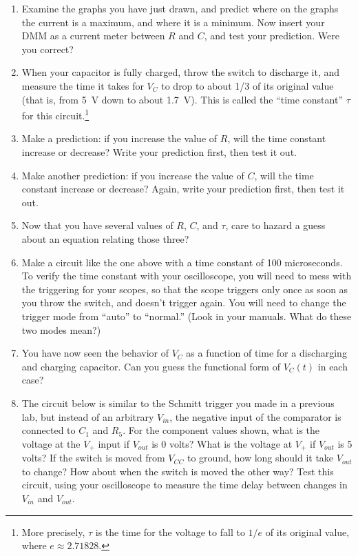 \begin{enumerate}[wide]
\item Examine the graphs you have just drawn, and predict where on the graphs the current is a maximum, and where it is a minimum.  Now insert your DMM as a current meter between $R$ and $C$, and test your prediction.  Were you correct?

\item When your capacitor is fully charged, throw the switch to discharge it, and measure the time it takes for $V_C$ to drop to about 1/3 of its original value (that is, from 5~V down to about 1.7~V).  This is called the ``time constant'' $\tau$ for this circuit.\footnote{More precisely, $\tau$ is the time for the voltage to fall to $1/e$ of its original value, where $e \approx 2.71828$.}

\item Make a prediction: if you increase the value of $R$, will the time constant increase or decrease?  Write your prediction first, then test it out.

\item Make another prediction: if you increase the value of $C$, will the time constant increase or decrease?  Again, write your prediction first, then test it out.

\item Now that you have several values of $R$, $C$, and $\tau$, care to hazard a guess about an equation relating those three?

\item Make a circuit like the one above with a time constant of 100 microseconds.   To verify the time constant with your oscilloscope, you will need to mess with the triggering for your scopes, so that the scope triggers only once as soon as you throw the switch, and doesn't trigger again.  You will need to change the trigger mode from ``auto'' to ``normal.''  (Look in your manuals.  What do these two modes mean?)

\item You have now seen the behavior of $V_C$ as a function of time for a discharging and charging capacitor.  Can you guess the functional form of $V_C(t)$ in each case?

\item The circuit below is similar to the Schmitt trigger you made in a previous lab, but instead of an arbitrary $V_{in}$, the negative input of the comparator is connected to $C_1$ and $R_5$.  
For the component values shown, what is the voltage at the $V_+$ input if $V_{out}$ is 0 volts?  
What is the voltage at $V_+$ if $V_{out}$ is 5 volts?  
If the switch is moved from $V_{CC}$ to ground, how long should it take $V_{out}$ to change?  How about when the switch is moved the other way?  Test this circuit, using your oscilloscope to measure the time delay between changes in $V_{in}$ and $V_{out}$.


\end{enumerate}
